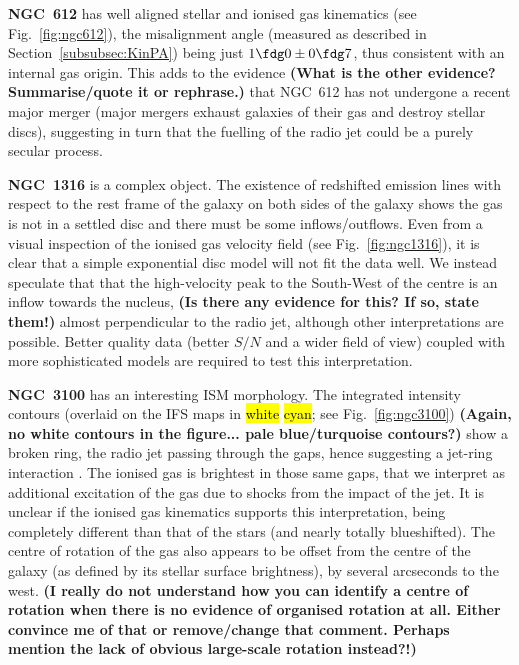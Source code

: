 \documentclass[a4paper,fleqn,usenatbib]{mnras}
\DeclareRobustCommand{\removed}[1]{{\sethlcolor{red}\hl{#1}}}
\DeclareRobustCommand{\added}[1]{{\sethlcolor{green}\hl{#1}}}
\begin{document}
\textbf{NGC~612} has well aligned stellar and ionised gas kinematics
(see Fig.~\ref{fig:ngc612}), the misalignment angle (measured as
described in Section~\ref{subsubsec:KinPA}) being just
$1\fdg0\pm0\fdg7$, thus consistent with an internal gas origin. This
adds to the evidence {\bf (What is the other evidence?
  Summarise/quote it or rephrase.)} that NGC~612 has not undergone a
recent major merger (major mergers exhaust galaxies of their gas and
destroy stellar discs), suggesting in turn that the fuelling of the
radio jet could be a purely secular process.


\textbf{NGC~1316} is a complex object. The existence of redshifted
emission lines with respect to the rest frame of the galaxy on both
sides of the galaxy shows the gas is not in a settled disc and there
must be some inflows/outflows. Even from a visual inspection of the
ionised gas velocity field (see Fig.~\ref{fig:ngc1316}), it is clear
that a simple exponential disc model will not fit the data well. We
instead speculate that that the high-velocity peak to the South-West
of the centre is an inflow towards the nucleus, {\bf (Is there any
  evidence for this? If so, state them!)} almost perpendicular to the
radio jet, although other interpretations are possible. Better quality
data (better $S/N$ and a wider field of view) coupled with more
sophisticated models are required to test this interpretation.
		

\textbf{NGC~3100} has an interesting ISM morphology. The
 integrated intensity contours (overlaid on the IFS
maps in \removed{white} \added{cyan}; see Fig.~\ref{fig:ngc3100}) 
{\bf (Again, no white
  contours in the figure... pale blue/turquoise contours?)} show a
broken ring, the radio jet passing through the gaps, hence suggesting
a jet-ring interaction \citep[see][]{ruffa2019, ruffa2020}. The
ionised gas is brightest in those same gaps, that we interpret as
additional excitation of the gas due to shocks from the impact of the
jet. It is unclear if the ionised gas kinematics supports this
interpretation, being completely different than that of the stars (and
nearly totally blueshifted). The centre of rotation of the gas also
appears to be offset from the centre of the galaxy (as defined by its
stellar surface brightness), by several arcseconds to the west. {\bf
  (I really do not understand how you can identify a centre of
  rotation when there is no evidence of organised rotation at
  all. Either convince me of that or remove/change that
  comment. Perhaps mention the lack of obvious large-scale rotation
  instead?!)}
\end{document}
